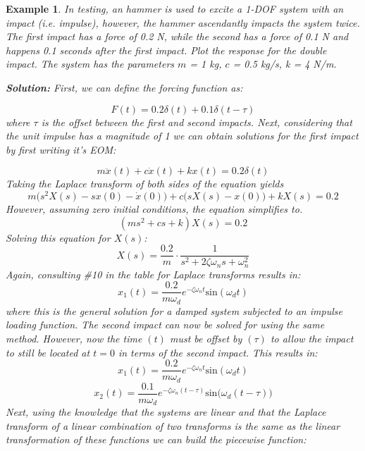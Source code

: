 \documentclass[12pt,letter]{article}
\newtheorem{ex}{Example}
\numberwithin{ex}{section} %
\newenvironment{example}{\begin{mdframed}[middlelinewidth=0.5mm]\begin{ex}\normalfont}{\end{ex}\end{mdframed}}
\numberwithin{re}{section} %
\numberwithin{equation}{section}	%
\begin{document}
\begin{example}


In testing, an hammer is used to excite a 1-DOF system with an impact (i.e. impulse), however, the hammer ascendantly impacts the system twice. The first impact has a force of 0.2 N, while the second has a force of 0.1 N and happens 0.1 seconds after the first impact. Plot the response for the double impact. The system has the parameters $m$ = 1 kg, $c$ = 0.5 kg/s, k = 4 N/m. 

\noindent\textbf{Solution:} First, we can define the forcing function as:

\begin{equation}
	F(t) = 0.2 \delta (t) + 0.1 \delta(t-\tau)
\end{equation}
where $\tau$ is the offset between the first and second impacts. Next, considering that the unit impulse has a magnitude of 1 we can obtain solutions for the first impact by first writing it's EOM:

\begin{equation}
m\ddot{x}(t) +c\dot{x}(t) +kx(t) =0.2 \delta(t)
\end{equation}
Taking the Laplace transform of both sides of the equation yields 
\begin{equation}
m\big(s^2X(s)-sx(0) - \dot{x}(0)\big) + c\big(sX(s)-x(0)\big) +kX(s) = 0.2
\end{equation}
However, assuming zero initial conditions, the equation simplifies to. 
\begin{equation}
(ms^2 + cs +k)X(s) = 0.2
\end{equation}
Solving this equation for $X(s)$:
\begin{equation}
X(s) = \frac{0.2}{m} \cdot \frac{1}{s^2 + 2 \zeta \omega_n s + \omega_n^2}
\end{equation}
Again, consulting \#10 in the table for Laplace transforms results in:
\begin{equation}
x_1(t) = \frac{0.2}{m \omega_d} e^{-\zeta \omega_n t} \text{sin}(\omega_dt)
\end{equation}
where this is the general solution for a damped system subjected to an impulse loading function. The second impact can now be solved for using the same method. However, now the time $(t)$ must be offset by $(\tau)$ to allow the impact to still be located at $t=0$ in terms of the second impact. This results in:
\begin{equation}
	x_1(t) = \frac{0.2}{m \omega_d} e^{-\zeta \omega_n t} \text{sin}(\omega_dt)
\end{equation}
\begin{equation}
	x_2(t) = \frac{0.1}{m \omega_d} e^{-\zeta \omega_n (t-\tau)} \text{sin}\big(\omega_d(t-\tau)\big)
\end{equation}
Next, using the knowledge that the systems are linear and that the Laplace transform of a linear combination of two transforms is the same as the linear transformation of these functions we can build the piecewise function:


\end{example}
\end{document}

